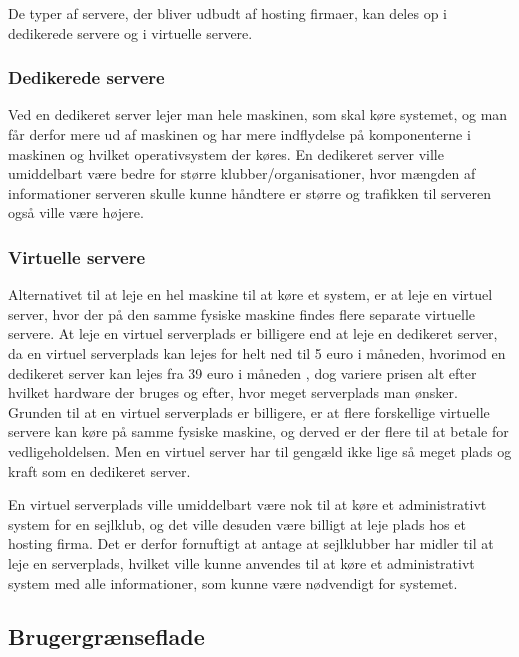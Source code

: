 De typer af servere, der bliver udbudt af hosting firmaer, kan deles op i dedikerede servere og i virtuelle
servere.


\subsubsection{Dedikerede servere}

Ved en dedikeret server lejer man hele maskinen, som skal køre systemet, og man får derfor mere ud af maskinen
og har mere indflydelse på komponenterne i maskinen og hvilket operativsystem der køres. En dedikeret server
ville umiddelbart være bedre for større klubber/organisationer, hvor mængden af informationer serveren skulle
kunne håndtere er større og trafikken til serveren også ville være højere. \citep{server}


\subsubsection{Virtuelle servere}

Alternativet til at leje en hel maskine til at køre et system, er at leje en virtuel server, hvor der på den
samme fysiske maskine findes flere separate virtuelle servere. At leje en virtuel serverplads er billigere end
at leje en dedikeret server, da en virtuel serverplads kan lejes for helt ned til 5 euro i
måneden\citep{Virtuelserver}, hvorimod en dedikeret server kan lejes fra 39 euro i måneden
\citep{Dedikeretserver}, dog variere prisen alt efter hvilket hardware der bruges og efter, hvor meget
serverplads man ønsker. Grunden til at en virtuel serverplads er billigere, er at flere forskellige virtuelle
servere kan køre på samme fysiske maskine, og derved er der flere til at betale for vedligeholdelsen. Men en
virtuel server har til gengæld ikke lige så meget plads og kraft som en dedikeret server.\citep{server}

En virtuel serverplads ville umiddelbart være nok til at køre et administrativt system for en sejlklub, og det
ville desuden være billigt at leje plads hos et hosting firma. Det er derfor fornuftigt at antage at
sejlklubber har midler til at leje en serverplads, hvilket ville kunne anvendes til at køre et administrativt
system med alle informationer, som kunne være nødvendigt for systemet.


\subsection{Brugergrænseflade}

